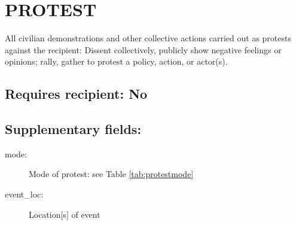 \documentclass[11pt]{report}
\begin{document}
\newpage  

\section{PROTEST}

All civilian demonstrations and other collective actions carried out as protests against the recipient: Dissent collectively, publicly show negative feelings or opinions; rally, gather to protest a policy, action, or actor(s).

\subsection{Requires recipient: No}

\subsection{Supplementary fields:}

\begin{description}
	\item[mode:] Mode of protest: see Table \ref{tab:protestmode} 
	\item[event\_loc:] Location[s] of event 
\end{description}

\end{document}
